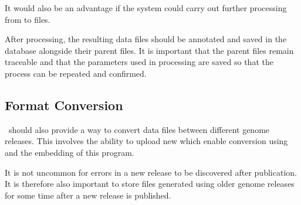 It would also be an advantage if the system could carry out further processing from  to  files.

After processing, the resulting data files should be annotated and saved in the database alongside their parent files. It is important that the parent files remain traceable and that the parameters used in processing are saved so that the process can be repeated and confirmed.

\subsection{Format Conversion}
\appName\ should also provide a way to convert  data files between different genome releases. This involves the ability to upload new  which enable conversion using  and the embedding of this program.

It is not uncommon for errors in a new release to be discovered after publication. It is therefore also important to store files generated using older genome releases for some time after a new release is published.

